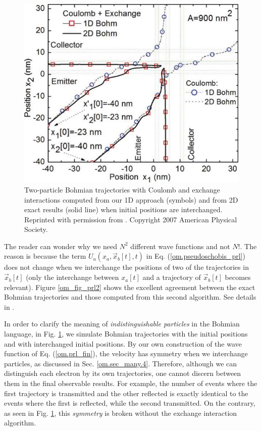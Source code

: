 \documentclass[onecolumn,nofootinbib, secnumarabic, amsmath, nobibnotes,11pt,aps,pra]{revtex4-1}
\newcommand{\fref}[1]{Fig. \ref{#1}}
\newcommand{\sref}[1]{Sec. \ref{#1}}
\newcommand{\eref}[1]{Eq. (\ref{#1})}
\newcommand{\Fref}[1]{Figure \ref{#1}}
\begin{document}
\begin{figure}
\includegraphics{ch1-08.pdf}
\caption{Two-particle Bohmian trajectories with Coulomb and exchange interactions computed from
our 1D approach (symbols) and from 2D exact results (solid line)
when initial positions are interchanged. Reprinted with permission
from \cite{om.oriolsprl}. Copyright 2007 American Physical Society.
} \label{om_fig_prl3}
\end{figure}

The reader can wonder why we need $N^2$ different wave functions and not $N!$. The reason is because the term \textit{$U_{a}(x_{a},\vec x_{b}[t],t)$} in \eref{om.pseudoschobis_prl} does not change when we interchange the positions of two of the trajectories in $\vec x_{b}[t]$ (only the interchange between $x_a[t]$ and a trajectory of $\vec x_{b}[t]$ becomes relevant). \Fref{om_fig_prl2} shows the excellent agreement between the exact Bohmian trajectories and those computed from this second algorithm. See details in \cite{om.oriolsprl}.

In order to clarify the meaning of \textit{indistinguishable
particles} in the Bohmian language, in \fref{om_fig_prl3},
we  simulate Bohmian trajectories with the
initial positions and with interchanged initial positions. By our
own construction of the wave function of \eref{om.prl_fin}, the
velocity has symmetry when we interchange particles, as discussed in
\sref{om.sec_many.4}. Therefore, although we can distinguish each
electron by its own trajectories, one cannot discern between them in
the final observable results. For example, the number of events
where the first trajectory is transmitted and the other reflected is
exactly identical to the events where the first is reflected, while
the second transmitted. On the contrary, as seen in
\fref{om_fig_prl3}, this \textit{symmetry} is broken without the
exchange interaction algorithm.
\end{document}
